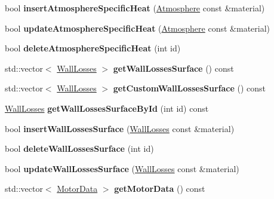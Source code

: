 \begin{DoxyCompactItemize}
bool {\bfseries insert\+Atmosphere\+Specific\+Heat} (\hyperlink{class_atmosphere}{Atmosphere} const \&material)
\item 
\mbox{\label{class_s_q_lite_a0980ef2dfdaadb27f86342f983019bb7}} 
bool {\bfseries update\+Atmosphere\+Specific\+Heat} (\hyperlink{class_atmosphere}{Atmosphere} const \&material)
\item 
\mbox{\label{class_s_q_lite_a32f61e2c425864cf222ee427abd33448}} 
bool {\bfseries delete\+Atmosphere\+Specific\+Heat} (int id)
\item 
\mbox{\label{class_s_q_lite_a612950dca9d08332a31a020783ba832d}} 
std\+::vector$<$ \hyperlink{class_wall_losses}{Wall\+Losses} $>$ {\bfseries get\+Wall\+Losses\+Surface} () const
\item 
\mbox{\label{class_s_q_lite_a0314139eab40caf617a2e8e465ba3913}} 
std\+::vector$<$ \hyperlink{class_wall_losses}{Wall\+Losses} $>$ {\bfseries get\+Custom\+Wall\+Losses\+Surface} () const
\item 
\mbox{\label{class_s_q_lite_a3a7f473d8e23630dae65cd3c3dd7fa97}} 
\hyperlink{class_wall_losses}{Wall\+Losses} {\bfseries get\+Wall\+Losses\+Surface\+By\+Id} (int id) const
\item 
\mbox{\label{class_s_q_lite_a97d510f6f16aa70c61a9dc6a629ad786}} 
bool {\bfseries insert\+Wall\+Losses\+Surface} (\hyperlink{class_wall_losses}{Wall\+Losses} const \&material)
\item 
\mbox{\label{class_s_q_lite_ab9492a672cb89dfeae330b99ea03ceeb}} 
bool {\bfseries delete\+Wall\+Losses\+Surface} (int id)
\item 
\mbox{\label{class_s_q_lite_ac4b7397ef51a0544d38f670ef995f26e}} 
bool {\bfseries update\+Wall\+Losses\+Surface} (\hyperlink{class_wall_losses}{Wall\+Losses} const \&material)
\item 
\mbox{\label{class_s_q_lite_a5fabd8387b0009f7641bce38ee8e41c5}} 
std\+::vector$<$ \hyperlink{class_motor_data}{Motor\+Data} $>$ {\bfseries get\+Motor\+Data} () const
\item 

\end{DoxyCompactItemize}
